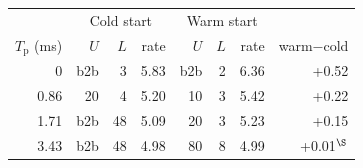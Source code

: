 \begin{tabular}{r|rrr|rrr|r}
\toprule
 & \multicolumn{3}{c|}{Cold start} & \multicolumn{3}{c|}{Warm start} & \\
$T_{\mathrm{p}}$ (ms) & $U$ & $L$ & rate & $U$ & $L$ & rate & warm$-$cold \\
\midrule
0 & b2b & 3 & 5.83 & b2b & 2 & 6.36 & +0.52 \\
0.86 & 20 & 4 & 5.20 & 10 & 3 & 5.42 & +0.22 \\
1.71 & b2b & 48 & 5.09 & 20 & 3 & 5.23 & +0.15 \\
3.43 & b2b & 48 & 4.98 & 80 & 8 & 4.99 & +0.01$^\S$ \\
\bottomrule
\end{tabular}
